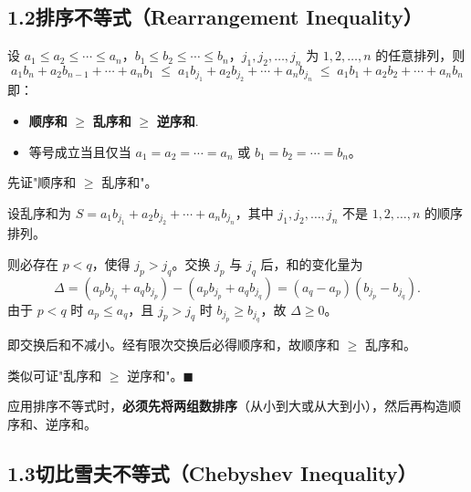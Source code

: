 \documentclass[12pt, a4paper]{ctexart}
\begin{document}
\subsection*{1.2\quad 排序不等式（Rearrangement Inequality）}

\begin{knowledgebox}[排序不等式]
设 $a_1 \leqslant a_2 \leqslant \cdots \leqslant a_n$，$b_1 \leqslant b_2 \leqslant \cdots \leqslant b_n$，$j_1, j_2, \ldots, j_n$ 为 $1,2,\ldots,n$ 的任意排列，则
\[
  \boxed{a_1 b_n + a_2 b_{n-1} + \cdots + a_n b_1 \;\leqslant\; a_1 b_{j_1} + a_2 b_{j_2} + \cdots + a_n b_{j_n} \;\leqslant\; a_1 b_1 + a_2 b_2 + \cdots + a_n b_n}
\]
即：
\begin{itemize}[leftmargin=2em]
  \item \textbf{顺序和} $\geqslant$ \textbf{乱序和} $\geqslant$ \textbf{逆序和}.
  \item 等号成立当且仅当 $a_1 = a_2 = \cdots = a_n$ 或 $b_1 = b_2 = \cdots = b_n$。
\end{itemize}
\end{knowledgebox}

\begin{knowledgebox}
先证"顺序和 $\geqslant$ 乱序和"。

设乱序和为 $S = a_1 b_{j_1} + a_2 b_{j_2} + \cdots + a_n b_{j_n}$，其中 $j_1, j_2, \ldots, j_n$ 不是 $1,2,\ldots,n$ 的顺序排列。

则必存在 $p < q$，使得 $j_p > j_q$。交换 $j_p$ 与 $j_q$ 后，和的变化量为
\[
  \Delta = (a_p b_{j_q} + a_q b_{j_p}) - (a_p b_{j_p} + a_q b_{j_q}) = (a_q - a_p)(b_{j_p} - b_{j_q}).
\]
由于 $p < q$ 时 $a_p \leqslant a_q$，且 $j_p > j_q$ 时 $b_{j_p} \geqslant b_{j_q}$，故 $\Delta \geqslant 0$。

即交换后和不减小。经有限次交换后必得顺序和，故顺序和 $\geqslant$ 乱序和。

类似可证"乱序和 $\geqslant$ 逆序和"。\hfill $\blacksquare$
\end{knowledgebox}

\begin{warnbox}[使用排序不等式的前提]
应用排序不等式时，\textbf{必须先将两组数排序}（从小到大或从大到小），然后再构造顺序和、逆序和。
\end{warnbox}

\subsection*{1.3\quad 切比雪夫不等式（Chebyshev Inequality）}
\end{document}
